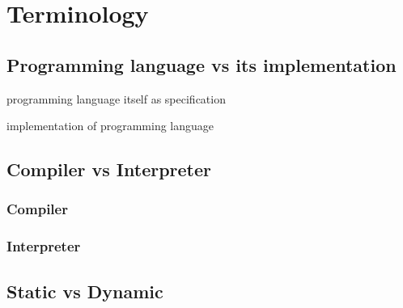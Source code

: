 \chapter{Terminology}\label{terminology}

\section{Programming language vs its implementation}\label{implementing}

\begin{decription}
\item{programming language} itself as specification
\item{implementation} of programming language 
\end{decription}

\section{Compiler vs Interpreter}

\subsection{Compiler}

\subsection{Interpreter}

\section{Static vs Dynamic}
